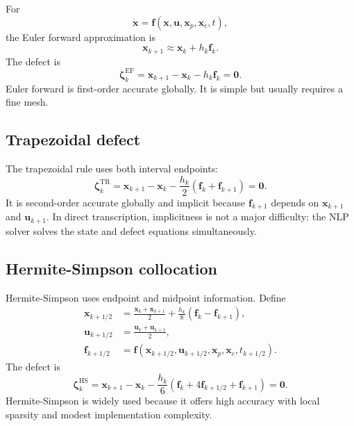 \documentclass[11pt]{article}
\newcommand{\vect}[1]{\boldsymbol{#1}}
\newcommand{\xp}{\vect{x}_p}
\newcommand{\xc}{\vect{x}_c}
\newcommand{\xstate}{\vect{x}}
\newcommand{\uvec}{\vect{u}}
\newcommand{\fvec}{\vect{f}}
\begin{document}
For
\begin{equation}
\dot{\xstate}=\fvec(\xstate,\uvec,\xp,\xc,t),
\end{equation}
the Euler forward approximation is
\begin{equation}
\xstate_{k+1}\approx\xstate_k+h_k\fvec_k.
\end{equation}
The defect is
\begin{equation}
\vect{\zeta}_k^{\mathrm{EF}}=
\xstate_{k+1}-\xstate_k-h_k\fvec_k=\vect{0}.
\label{eq:euler-defect}
\end{equation}
Euler forward is first-order accurate globally. It is simple but usually requires a fine mesh.

\subsection{Trapezoidal defect}

The trapezoidal rule uses both interval endpoints:
\begin{equation}
\vect{\zeta}_k^{\mathrm{TR}}=
\xstate_{k+1}-\xstate_k-\frac{h_k}{2}\left(\fvec_k+\fvec_{k+1}\right)=\vect{0}.
\label{eq:trap-defect}
\end{equation}
It is second-order accurate globally and implicit because $\fvec_{k+1}$ depends on $\xstate_{k+1}$ and $\uvec_{k+1}$. In direct transcription, implicitness is not a major difficulty: the NLP solver solves the state and defect equations simultaneously.

\subsection{Hermite-Simpson collocation}

Hermite-Simpson uses endpoint and midpoint information. Define
\begin{align}
\xstate_{k+1/2} &=
\frac{\xstate_k+\xstate_{k+1}}{2}
+\frac{h_k}{8}\left(\fvec_k-\fvec_{k+1}\right),
\label{eq:hs-midstate}\\
\uvec_{k+1/2} &= \frac{\uvec_k+\uvec_{k+1}}{2},\\
\fvec_{k+1/2} &=
\fvec\left(\xstate_{k+1/2},\uvec_{k+1/2},\xp,\xc,t_{k+1/2}\right).
\end{align}
The defect is
\begin{equation}
\vect{\zeta}_k^{\mathrm{HS}}=
\xstate_{k+1}-\xstate_k-\frac{h_k}{6}
\left(\fvec_k+4\fvec_{k+1/2}+\fvec_{k+1}\right)=\vect{0}.
\label{eq:hs-defect}
\end{equation}
Hermite-Simpson is widely used because it offers high accuracy with local sparsity and modest implementation complexity.
\end{document}
